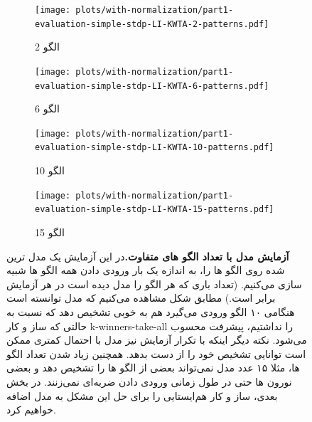         \begin{figure}[!ht]
            \centering
            \begin{adjustbox}{minipage=\linewidth,scale=1}
                \begin{subfigure}[b]{0.5\textwidth}
                    \centering
                    \texttt{[image: plots/with-normalization/part1-evaluation-simple-stdp-LI-KWTA-2-patterns.pdf]}
                    \caption{2 الگو}
                    \label{fig:part1-evaluation-simple-stdp-LI-KWTA-2-patterns}
                \end{subfigure}
                \hfill
                \begin{subfigure}[b]{0.5\textwidth}
                    \centering
                    \texttt{[image: plots/with-normalization/part1-evaluation-simple-stdp-LI-KWTA-6-patterns.pdf]}
                    \caption{6 الگو}
                    \label{fig:part1-evaluation-simple-stdp-LI-KWTA-4-patterns}
                \end{subfigure}
                \vfill
                \begin{subfigure}[b]{0.5\textwidth}
                    \centering
                    \texttt{[image: plots/with-normalization/part1-evaluation-simple-stdp-LI-KWTA-10-patterns.pdf]}
                    \caption{10 الگو}
                    \label{fig:part1-evaluation-simple-stdp-LI-KWTA-6-patterns}
                \end{subfigure}
                \hfill
                \begin{subfigure}[b]{0.5\textwidth}
                    \centering
                    \texttt{[image: plots/with-normalization/part1-evaluation-simple-stdp-LI-KWTA-15-patterns.pdf]}
                    \caption{15 الگو}
                    \label{fig:part1-evaluation-simple-stdp-LI-KWTA-15-patterns}
                \end{subfigure}
            \end{adjustbox}
            \caption{\textbf{آزمایش مدل با تعداد الگو های متفاوت.}در این آزمایش یک مدل ترین شده روی الگو ها را، به اندازه یک بار ورودی دادن همه الگو ها شبیه سازی می‌کنیم. 
            (تعداد باری که هر الگو را مدل دیده است در هر آزمایش برابر است.) 
            مطابق شکل مشاهده می‌کنیم که مدل توانسته است هنگامی ۱۰ الگو ورودی می‌گیرد هم به خوبی تشخیص دهد که نسبت به حالتی که ساز و کار 
            k-winners-take-all 
            را نداشتیم، پیشرفت محسوب می‌شود. نکته دیگر اینکه با تکرار آزمایش نیز مدل با احتمال کمتری ممکن است توانایی تشخیص خود را از دست بدهد. همچنین زیاد شدن تعداد الگو ها، مثلا ۱۵ عدد مدل نمی‌تواند بعضی از الگو ها را تشخیص دهد و بعضی نورون ها حتی در طول زمانی ورودی دادن ضربه‌ای نمی‌زنند. در بخش بعدی، ساز و کار هم‌ایستایی را برای حل این مشکل به مدل اضافه خواهیم کرد.}
            \label{fig:part1-evaluation-simple-stdp-LI-KWTA}
        \end{figure}

    